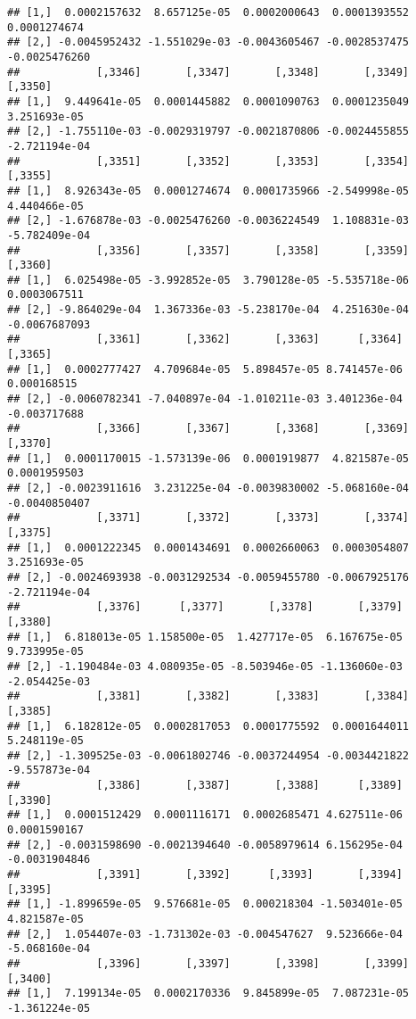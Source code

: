 \documentclass[
]{article}
\begin{document}
\begin{verbatim}
## [1,]  0.0002157632  8.657125e-05  0.0002000643  0.0001393552  0.0001274674
## [2,] -0.0045952432 -1.551029e-03 -0.0043605467 -0.0028537475 -0.0025476260
##            [,3346]       [,3347]       [,3348]       [,3349]       [,3350]
## [1,]  9.449641e-05  0.0001445882  0.0001090763  0.0001235049  3.251693e-05
## [2,] -1.755110e-03 -0.0029319797 -0.0021870806 -0.0024455855 -2.721194e-04
##            [,3351]       [,3352]       [,3353]       [,3354]       [,3355]
## [1,]  8.926343e-05  0.0001274674  0.0001735966 -2.549998e-05  4.440466e-05
## [2,] -1.676878e-03 -0.0025476260 -0.0036224549  1.108831e-03 -5.782409e-04
##            [,3356]       [,3357]       [,3358]       [,3359]       [,3360]
## [1,]  6.025498e-05 -3.992852e-05  3.790128e-05 -5.535718e-06  0.0003067511
## [2,] -9.864029e-04  1.367336e-03 -5.238170e-04  4.251630e-04 -0.0067687093
##            [,3361]       [,3362]       [,3363]      [,3364]      [,3365]
## [1,]  0.0002777427  4.709684e-05  5.898457e-05 8.741457e-06  0.000168515
## [2,] -0.0060782341 -7.040897e-04 -1.010211e-03 3.401236e-04 -0.003717688
##            [,3366]       [,3367]       [,3368]       [,3369]       [,3370]
## [1,]  0.0001170015 -1.573139e-06  0.0001919877  4.821587e-05  0.0001959503
## [2,] -0.0023911616  3.231225e-04 -0.0039830002 -5.068160e-04 -0.0040850407
##            [,3371]       [,3372]       [,3373]       [,3374]       [,3375]
## [1,]  0.0001222345  0.0001434691  0.0002660063  0.0003054807  3.251693e-05
## [2,] -0.0024693938 -0.0031292534 -0.0059455780 -0.0067925176 -2.721194e-04
##            [,3376]      [,3377]       [,3378]       [,3379]       [,3380]
## [1,]  6.818013e-05 1.158500e-05  1.427717e-05  6.167675e-05  9.733995e-05
## [2,] -1.190484e-03 4.080935e-05 -8.503946e-05 -1.136060e-03 -2.054425e-03
##            [,3381]       [,3382]       [,3383]       [,3384]       [,3385]
## [1,]  6.182812e-05  0.0002817053  0.0001775592  0.0001644011  5.248119e-05
## [2,] -1.309525e-03 -0.0061802746 -0.0037244954 -0.0034421822 -9.557873e-04
##            [,3386]       [,3387]       [,3388]      [,3389]       [,3390]
## [1,]  0.0001512429  0.0001116171  0.0002685471 4.627511e-06  0.0001590167
## [2,] -0.0031598690 -0.0021394640 -0.0058979614 6.156295e-04 -0.0031904846
##            [,3391]       [,3392]      [,3393]       [,3394]       [,3395]
## [1,] -1.899659e-05  9.576681e-05  0.000218304 -1.503401e-05  4.821587e-05
## [2,]  1.054407e-03 -1.731302e-03 -0.004547627  9.523666e-04 -5.068160e-04
##            [,3396]       [,3397]       [,3398]       [,3399]       [,3400]
## [1,]  7.199134e-05  0.0002170336  9.845899e-05  7.087231e-05 -1.361224e-05

\end{verbatim}
\end{document}
